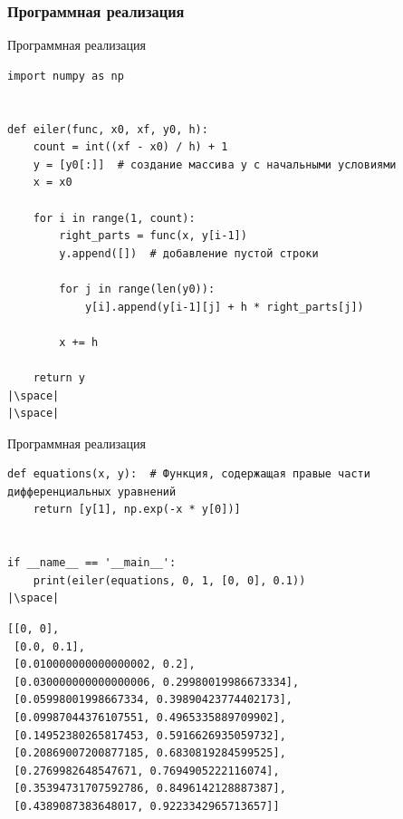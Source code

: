 \documentclass[aspectratio=169, mathserif]{beamer}	%
\begin{document}
\subsubsection{Программная реализация}
\begin{frame}[fragile, label=c]{Программная реализация}
\scriptsize
\begin{verbatim}
import numpy as np


def eiler(func, x0, xf, y0, h):
    count = int((xf - x0) / h) + 1
    y = [y0[:]]  # создание массива y с начальными условиями
    x = x0

    for i in range(1, count):
        right_parts = func(x, y[i-1])
        y.append([])  # добавление пустой строки

        for j in range(len(y0)):
            y[i].append(y[i-1][j] + h * right_parts[j])

        x += h

    return y
|\space|
|\space|
\end{verbatim}
\vfill
\end{frame}


\begin{frame}[fragile, label=c]{Программная реализация}
\scriptsize
\begin{verbatim}
def equations(x, y):  # Функция, содержащая правые части дифференциальных уравнений
    return [y[1], np.exp(-x * y[0])]


if __name__ == '__main__':
    print(eiler(equations, 0, 1, [0, 0], 0.1))
|\space|
\end{verbatim}
\vfill
\begin{verbatim}
[[0, 0],
 [0.0, 0.1],
 [0.010000000000000002, 0.2],
 [0.030000000000000006, 0.29980019986673334],
 [0.05998001998667334, 0.39890423774402173],
 [0.09987044376107551, 0.4965335889709902],
 [0.14952380265817453, 0.5916626935059732],
 [0.20869007200877185, 0.6830819284599525],
 [0.2769982648547671, 0.7694905222116074],
 [0.35394731707592786, 0.8496142128887387],
 [0.4389087383648017, 0.9223342965713657]]
\end{verbatim}
\vfill
\end{frame}
\end{document}
